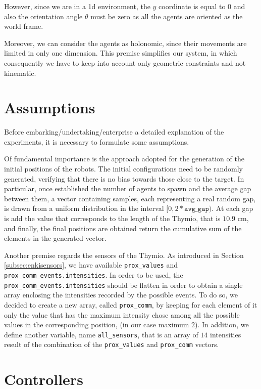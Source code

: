 However, since we are in a \gls{1d} environment, the $y$ coordinate is equal 
to $0$ and also the orientation angle $\theta$ must be zero as all the agents are 
oriented as the world frame. 

Moreover, we can consider the agents as holonomic, since their movements are 
limited in only one dimension. This premise simplifies our system, in which 
consequently we have to keep into account only geometric constraints and not
kinematic.

\section{Assumptions}
\label{sec:assum}
Before embarking/undertaking/enterprise a detailed explanation of the 
experiments, it is necessary to formulate some assumptions.

Of fundamental importance is the approach adopted for the generation of the 
initial positions of the robots.
The initial configurations need to be randomly generated, verifying that there is 
no bias towards those close to the target.
In particular, once established the number of agents to spawn and the average 
gap between them, a vector containing samples, each representing a real random 
gap, is drawn from a uniform distribution in the interval $[0, 
2*\mathtt{avg\_gap})$. 
At each gap is add the value that corresponds to the length of the Thymio, that is 
$10.9$ \gls{cm}, and finally, the final positions are obtained return the cumulative 
sum of the elements in the generated vector. 

Another premise regards the sensors of the Thymio. 
As introduced in Section \ref{subsec:enkisensors}, we have available 
\texttt{prox\_values} and \texttt{prox\_comm\_events.intensities}. In order to be 
used, the \texttt{prox\_comm\_events.intensities} should be flatten in order to 
obtain a single array enclosing the intensities recorded by the possible events. 
To do so, we decided to create a new array, called \texttt{prox\_comm}, by 
keeping for each element of it only the value that has the maximum intensity 
chose among all the possible values in the corresponding position, (in our case 
maximum $2$).
In addition, we define another variable, name \texttt{all\_sensors}, that is an array 
of $14$ intensities result of the combination of the \texttt{prox\_values} and 
\texttt{prox\_comm} vectors.

\section{Controllers}
\label{sec:controllers}

